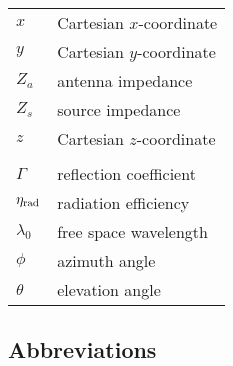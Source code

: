 \begin{tabular}{ll}
$x$          & Cartesian $x$-coordinate\\
$y$          & Cartesian $y$-coordinate\\
$Z_a$        & antenna impedance\\
$Z_s$        & source impedance\\
$z$          & Cartesian $z$-coordinate\\
& \\
$\Gamma$     & reflection coefficient\\
${\eta}_{\mathrm{rad}}$ & radiation efficiency \\
$\lambda_0$  & free space wavelength\\
$\phi$       & azimuth angle\\
$\theta$     & elevation angle\\


\end{tabular}



\subsection*{Abbreviations}

